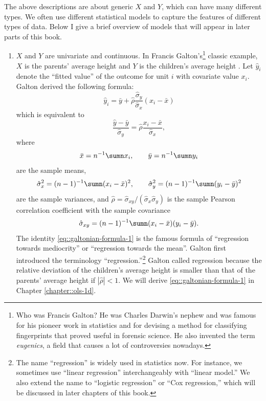 The above descriptions are about generic $X$ and $Y$, which can have many different types. We often use different statistical models to capture the features of different types of data. Below I give a brief overview
of models that will appear in later parts of this book.
\begin{enumerate}[label=(T\arabic*), ref=T\arabic*]
\item $X$ and $Y$ are univariate and continuous. In Francis Galton's\footnote{Who was Francis Galton? He was Charles Darwin's nephew and was famous
for his pioneer work in statistics and for devising a method for classifying
fingerprints that proved useful in forensic science. He also invented the term {\it eugenics}, a field that causes a lot of controversies nowadays.} classic example, $X$ is the parents' average height and $Y$ is the children's
average height \citep{galton1886regression}. 
Let $\hat{y}_i$ denote the ``fitted value'' of the outcome for unit $i$ with covariate value $x_i$. 
Galton derived the following formula:
\[
\hat{y}_i = \bar{y} + \hat\rho \frac{\hat{\sigma}_{y}}{\hat{\sigma}_{x}} (x_i -\bar{x})
\]
which is equivalent to
\begin{equation}
\label{eq::galtonian-formula-1}
\frac{\hat{y}-\bar{y}}{\hat{\sigma}_{y}}
= \hat\rho \frac{x_i-\bar{x}}{\hat{\sigma}_{x}},
\end{equation}
where 
$$
\bar{x} = n^{-1} \sumn x_i,\qquad \bar{y} = n^{-1} \sumn y_i
$$ 
are the sample means, 
$$
\hat{\sigma}_{x}^2 = (n-1)^{-1} \sumn (x_i - \bar{x})^2,\qquad \hat{\sigma}_{y}^2 =  (n-1)^{-1} \sumn (y_i - \bar{y})^2
$$ 
are the sample variances, and $ \hat\rho =  \hat{\sigma}_{xy} / ( \hat{\sigma}_{x} \hat{\sigma}_{y} ) $ is the
sample Pearson correlation coefficient with the sample covariance 
$$
\hat{\sigma}_{xy}  =  (n-1)^{-1} \sumn(x_{i}-\bar{x})(y_{i}-\bar{y}).
$$
The identity \eqref{eq::galtonian-formula-1} is the famous formula of ``regression towards mediocrity'' or ``regression towards the mean''. Galton first introduced the terminology ``regression.''\footnote{The name ``regression'' is widely used in statistics now. For instance, we sometimes use ``linear regression'' interchangeably with ``linear model.'' We also extend the name to ``logistic regression'' or ``Cox regression,'' which will be discussed in later chapters of this book.} 
Galton called regression because the relative deviation of the children's average height is smaller than that of the parents' average height if $ | \hat\rho  | < 1$. We will derive \eqref{eq::galtonian-formula-1} in Chapter \ref{chapter::ols-1d}. 
 

\end{enumerate}
